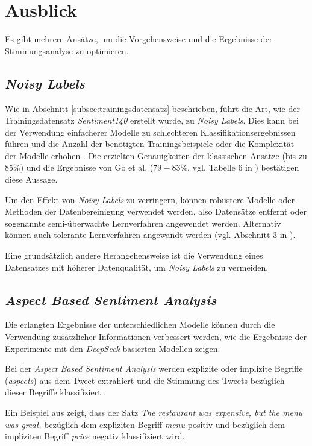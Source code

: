 \section{Ausblick}\label{sec:ausblick}

Es gibt mehrere Ansätze, um die Vorgehensweise und die Ergebnisse der Stimmungsanalyse zu optimieren.

\subsection{\textit{Noisy Labels}}
Wie in Abschnitt \ref{subsec:trainingsdatensatz} beschrieben, führt die Art, wie der Trainingsdatensatz \textit{Sentiment140} erstellt wurde, zu \textit{Noisy Labels}.
Dies kann bei der Verwendung einfacherer Modelle zu schlechteren Klassifikationsergebnissen führen und die Anzahl der benötigten Trainingsbeispiele oder die Komplexität der Modelle erhöhen \cite{NoisyLabel2014}.
Die erzielten Genauigkeiten der klassischen Ansätze (bis zu 85\%) und die Ergebnisse von  Go et al. ($79-83\%$, vgl. Tabelle 6 in \cite{go2009twitter}) bestätigen diese Aussage.

Um den Effekt von \textit{Noisy Labels} zu verringern, können robustere Modelle oder Methoden der Datenbereinigung verwendet werden, also Datensätze entfernt oder sogenannte semi-überwachte Lernverfahren angewendet werden. Alternativ können auch tolerante Lernverfahren angewandt werden (vgl. Abschnitt 3 in \cite{NoisyLabel2014}).

Eine grundsätzlich andere Herangehensweise ist die Verwendung eines Datensatzes mit höherer Datenqualität, um \textit{Noisy Labels} zu vermeiden.

\subsection{\textit{Aspect Based Sentiment Analysis}}

Die erlangten Ergebnisse der unterschiedlichen Modelle können durch die Verwendung zusätzlicher Informationen verbessert werden, wie die Ergebnisse der Experimente mit den \textit{DeepSeek}-basierten Modellen zeigen.

Bei der \textit{Aspect Based Sentiment Analysis} werden explizite oder implizite Begriffe (\textit{aspects}) aus dem Tweet extrahiert und die Stimmung des Tweets bezüglich dieser Begriffe klassifiziert \cite{Hua_2024}.

Ein Beispiel aus \cite{Hua_2024} zeigt, dass der Satz \glqq \textit{The restaurant was expensive, but the menu was great.}\grqq{} bezüglich dem expliziten Begriff \textit{menu} positiv und bezüglich dem impliziten Begriff \textit{price} negativ klassifiziert wird.

